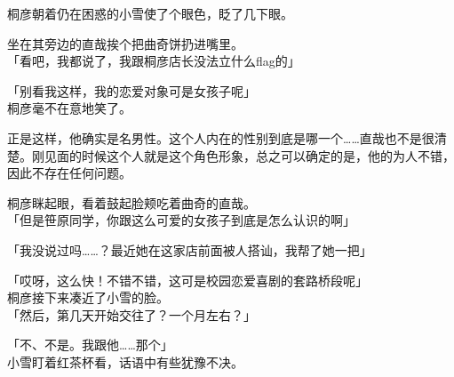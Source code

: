 桐彦朝着仍在困惑的小雪使了个眼色，眨了几下眼。

坐在其旁边的直哉挨个把曲奇饼扔进嘴里。\\

「看吧，我都说了，我跟桐彦店长没法立什么flag的」

「别看我这样，我的恋爱对象可是女孩子呢」\\

桐彦毫不在意地笑了。

正是这样，他确实是名男性。这个人内在的性别到底是哪一个……直哉也不是很清楚。刚见面的时候这个人就是这个角色形象，总之可以确定的是，他的为人不错，因此不存在任何问题。

桐彦眯起眼，看着鼓起脸颊吃着曲奇的直哉。\\

「但是笹原同学，你跟这么可爱的女孩子到底是怎么认识的啊」

「我没说过吗……？最近她在这家店前面被人搭讪，我帮了她一把」

「哎呀，这么快！不错不错，这可是校园恋爱喜剧的套路桥段呢」\\

桐彦接下来凑近了小雪的脸。\\

「然后，第几天开始交往了？一个月左右？」

「不、不是。我跟他……那个」\\

小雪盯着红茶杯看，话语中有些犹豫不决。

